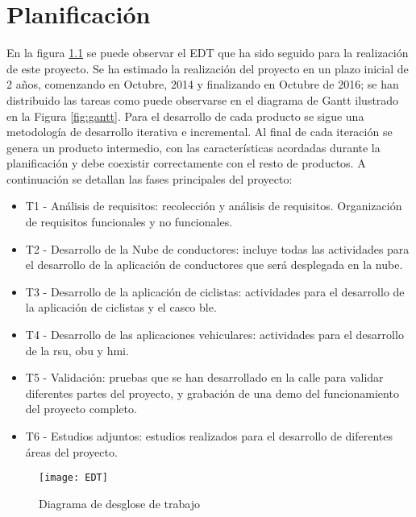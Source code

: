 \chapter{Planificación}
En la figura \ref{fig:edt} se puede observar el EDT que ha sido seguido para la
realización de este proyecto. Se ha estimado la realización del proyecto en un
plazo inicial de 2 años, comenzando en Octubre, 2014 y finalizando en Octubre de
2016; se han distribuido las tareas como puede observarse en el diagrama de
Gantt ilustrado en la Figura \ref{fig:gantt}. Para el desarrollo de cada
producto se sigue una metodología de desarrollo iterativa e incremental. Al
final de cada iteración se genera un producto intermedio, con las
características acordadas durante la planificación y debe coexistir
correctamente con el resto de productos. A continuación se detallan las fases
principales del proyecto:
\begin{itemize}
	\item T1 - Análisis de requisitos: recolección y análisis de requisitos.
	Organización de requisitos funcionales y no funcionales.

	\item T2 - Desarrollo de la Nube de conductores: incluye todas las actividades
	para el	desarrollo de la aplicación de conductores que será desplegada en la
	nube.

	\item T3 - Desarrollo de la aplicación de ciclistas: actividades para el
	desarrollo 	de la aplicación de ciclistas y el casco \gls{ble}.

	\item T4 - Desarrollo de las aplicaciones vehiculares: actividades para el
	desarrollo de la \gls{rsu}, \gls{obu} y \gls{hmi}.

	\item T5 - Validación: pruebas que se han desarrollado en la calle para
	validar diferentes partes del proyecto, y grabación de una demo del
	funcionamiento del proyecto completo.

	\item T6 - Estudios adjuntos: estudios realizados para el desarrollo de
	diferentes áreas del proyecto.
\end{itemize}

\begin{figure}[t]
	\begin{center}
		 {
			\texttt{[image: EDT]}
		}
		\caption{Diagrama de desglose de trabajo}
		\label{fig:edt}
	\end{center}
\end{figure}

